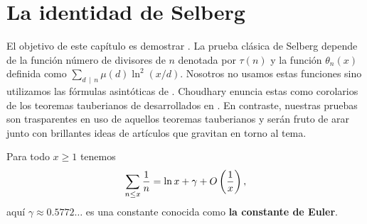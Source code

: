 \setlength{\headheight}{14.61858pt}
\pagestyle{fancy}

\chapter[La identidad de Selberg]
{La identidad de Selberg}
\label{ch:selberg}

El objetivo de este cap\'itulo es demostrar \cite[ecuaci\'on 2.8]{Selberg1949}.
La prueba cl\'asica de Selberg depende de la funci\'on
n\'umero de divisores de \(n\) denotada por \(\tau(n)\)
y la funci\'on \(\theta_n(x)\) definida como \(\sum_{d \, \mid \, n} \mu(d) \ln^2(x / d)\).
Nosotros no usamos estas funciones
sino utilizamos las f\'ormulas asint\'oticas
de \cite[corolario 4.2]{Choudhary2017}.
Choudhary enuncia estas como corolarios de los
teoremas tauberianos de \cite{Shapiro1959}
desarrollados en \cite[teorema 4.1]{Choudhary2017}.
En contraste, nuestras pruebas son trasparentes en uso
de aquellos teoremas tauberianos y ser\'an fruto de
arar \cite{Apostol1976} junto con brillantes ideas de art\'iculos que gravitan en torno al tema.

\begin{lemma}
  \label{lem:harmonic}
  Para todo \(x \geq 1\) tenemos
  \[
    \sum_{n \leq x} \frac{1}{n} = \ln x + \gamma + O\left( \frac{1}{x} \right),
  \]
  aqu\'i \(\gamma \approx 0.5772 \dots\) es una constante conocida como
  \textbf{la constante de Euler}.
\end{lemma}

